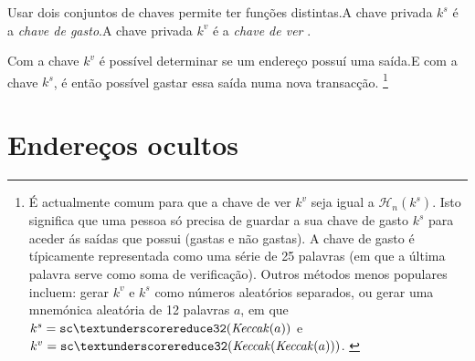 Usar dois conjuntos de chaves permite ter funções distintas.\newline A chave privada $k^s$ é a {\em chave de gasto}.\newline A chave privada $k^v$ é a {\em chave de ver} .  

Com a chave $k^v$ é possível determinar se um endereço possuí uma saída.\newline E com a chave $k^s$, é então possível gastar essa saída numa nova transacção. 
\footnote{É actualmente comum para que a chave de ver $k^v$ seja igual a $\mathcal{H}_n(k^s)$. Isto significa que uma pessoa só precisa de guardar a sua chave de gasto $k^s$ para aceder ás saídas que possui (gastas e não gastas). A chave de gasto é típicamente representada como uma série de 25 palavras (em que a última palavra serve como soma de verificação). Outros métodos menos populares incluem: gerar $k^v$ e $k^s$ como números aleatórios separados, ou gerar uma mnemónica aleatória de 12 palavras $a$, em que $k^s = {\tt sc\textunderscore reduce32}(\mathit{Keccak}(a))$ e $k^v = {\tt sc\textunderscore reduce32}(\mathit{Keccak}(\mathit{Keccak}(a)))$. \cite{luigi-address}}  



\section{Endereços ocultos}
\label{sec:one-time-addresses}

